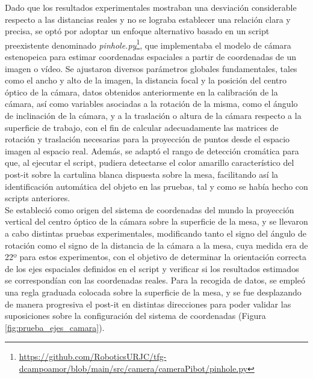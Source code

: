 Dado que los resultados experimentales mostraban una desviación considerable respecto a las distancias reales y no se lograba establecer una relación clara y precisa, se optó por adoptar un enfoque alternativo basado en un script preexistente denominado \textit{pinhole.py}\footnote{\url{https://github.com/RoboticsURJC/tfg-dcampoamor/blob/main/src/camera/cameraPibot/pinhole.py}}, que implementaba el modelo de cámara estenopeica para estimar coordenadas espaciales a partir de coordenadas de un imagen o vídeo. Se ajustaron diversos parámetros globales fundamentales, tales como el ancho y alto de la imagen, la distancia focal y la posición del centro óptico de la cámara, datos obtenidos anteriormente en la calibración de la cámara, así como variables asociadas a la rotación de la misma, como el ángulo de inclinación de la cámara, y a la traslación o altura de la cámara respecto a la superficie de trabajo, con el fin de calcular adecuadamente las matrices de rotación y traslación necesarias para la proyección de puntos desde el espacio imagen al espacio real. Además, se adaptó el rango de detección cromática para que, al ejecutar el script, pudiera detectarse el color amarillo característico del post-it sobre la cartulina blanca dispuesta sobre la mesa, facilitando así la identificación automática del objeto en las pruebas, tal y como se había hecho con scripts anteriores.\\

Se estableció como origen del sistema de coordenadas del mundo la proyección vertical del centro óptico de la cámara sobre la superficie de la mesa, y se llevaron a cabo distintas pruebas experimentales, modificando tanto el signo del ángulo de rotación como el signo de la distancia de la cámara a la mesa, cuya medida era de 22º para estos experimentos, con el objetivo de determinar la orientación correcta de los ejes espaciales definidos en el script y verificar si los resultados estimados se correspondían con las coordenadas reales. Para la recogida de datos, se empleó una regla graduada colocada sobre la superficie de la mesa, y se fue desplazando de manera progresiva el post-it en distintas direcciones para poder validar las suposiciones sobre la configuración del sistema de coordenadas (Figura \ref{fig:prueba_ejes_camara}).

